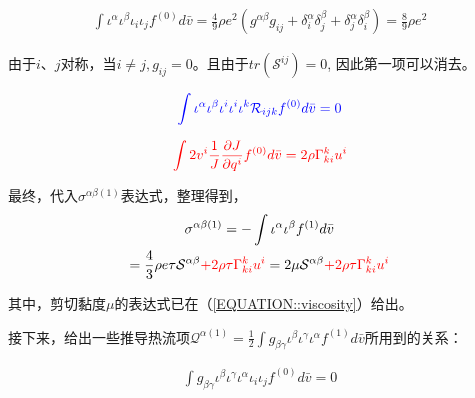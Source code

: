 \documentclass[LBMDerivation.tex]{subfiles}
\begin{document}
\begin{equation}
  \begin{gathered}
    \int \iota^\alpha \iota^\beta \iota_i \iota_j  f^{(0)}  d \bar{v}=\frac{4}{9}\rho e^2 (g^{\alpha \beta}g_{ij}+\delta^{\alpha}_i \delta^{\beta}_j+\delta^{\alpha}_j \delta^{\beta}_i)=\frac{8}{9}\rho e^2
  \end{gathered}
\end{equation}

由于$i$、$j$对称，当$i\neq j,g_{ij}=0$。且由于$tr(\mathcal{S}^{ij})=0$, 因此第一项可以消去。

\begin{equation}
  \begin{gathered}
    {\color{blue} \int \iota^\alpha \iota^\beta \iota^i\iota^i\iota^k \mathcal{R}_{ijk}  f^{(0)}   d \bar{v} =0}
  \end{gathered}
\end{equation}

\begin{equation}
  \begin{gathered}
    {\color{red} \int 2v^i  \frac{1}{J}\frac{\partial J}{\partial q^i}  f^{(0)} d \bar{v} = 2\rho  \Gamma_{ki}^k u^i}
  \end{gathered}
\end{equation}

最终，代入$\sigma^{\alpha\beta(1)}$表达式，整理得到，
\begin{equation}
  \begin{gathered}
    \sigma^{\alpha\beta(1)} =-\int \iota^{\alpha} \iota^{\beta} f^{(1)}  d \bar{v} \\
    = \frac{4}{3} \rho e \tau  \mathcal{S}^{\alpha\beta}{\color{red} + 2\rho \tau \Gamma_{ki}^k u^i} =  2 \mu \mathcal{S}^{\alpha\beta}  {\color{red} + 2\rho \tau \Gamma_{ki}^k u^i}
  \end{gathered}
\end{equation}

其中，剪切黏度$\mu$的表达式已在（\ref{EQUATION::viscosity}）给出。


接下来，给出一些推导热流项$\mathcal{Q}^{\alpha (1)}=\frac{1}{2}\int g_{\beta\gamma} \iota^{\beta} \iota^{\gamma}  \iota^{\alpha} f^{(1)}  d \bar{v}$所用到的关系：

\begin{equation}
  \begin{gathered}
    \int g_{\beta\gamma} \iota^{\beta} \iota^{\gamma}  \iota^{\alpha} \iota_i \iota_j  f^{(0)}  d \bar{v} =0
  \end{gathered}
\end{equation}
\end{document}
